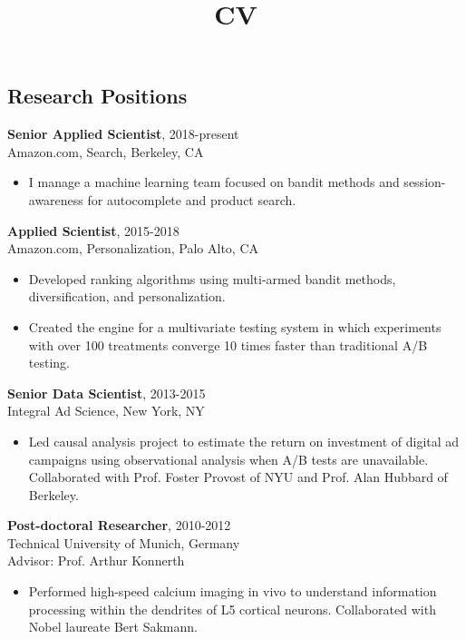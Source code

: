 \documentclass[line,11pt]{res}
\title{CV}
\begin{document}
 
\thispagestyle{empty} %
\address{246 $2^{nd}$ St. \#1401, San Francisco, CA 94105}
\address{716.771.8224}
\address{daniel.n.hill@gmail.com}
\address{www.danielnhill.com}

\begin{resume}

\section{Research Positions}
\vspace{0.1in} 

 {\bf Senior Applied Scientist}, 2018-present \\ Amazon.com, Search, Berkeley, CA 
  \begin{itemize}
          \item[] I manage a machine learning team focused on bandit methods and session-awareness for autocomplete and product search.
   \end{itemize}

 {\bf Applied Scientist}, 2015-2018 \\ Amazon.com, Personalization, Palo Alto, CA 
  \begin{itemize}
          \item[] Developed ranking algorithms using multi-armed bandit methods, diversification, and personalization.  
         \item[] Created the engine for a multivariate testing system in which experiments with over 100 treatments converge 10 times faster than traditional A/B testing.  
   \end{itemize}
   
 {\bf Senior Data Scientist}, 2013-2015 \\ Integral Ad Science, New York, NY 
  \begin{itemize}
          \item[] Led causal analysis project to estimate the return on investment of digital ad campaigns using observational analysis when A/B tests are unavailable.  Collaborated with Prof. Foster Provost of NYU and Prof. Alan Hubbard of Berkeley.  
   \end{itemize}
   
 {\bf Post-doctoral Researcher}, 2010-2012 \\ Technical University of Munich, Germany 
 \\ Advisor: Prof. Arthur Konnerth
  \begin{itemize}
        \item[] Performed high-speed calcium imaging in vivo to understand information processing within the dendrites of L5 cortical neurons.  Collaborated with Nobel laureate Bert Sakmann.
  \end{itemize}
    

\end{resume}
\end{document}
